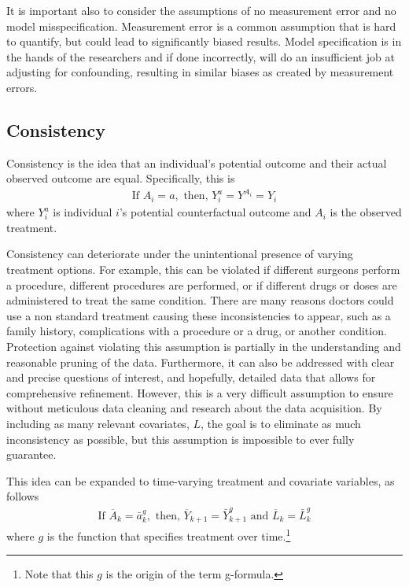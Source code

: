 It is important also to consider the assumptions of no measurement error and no model misspecification.  Measurement error is a common assumption that is hard to quantify, but could lead to significantly biased results.  Model specification is in the hands of the researchers and if done incorrectly, will do an insufficient job at adjusting for confounding, resulting in similar biases as created by measurement errors.  
 
\subsection{Consistency} 
Consistency is the idea that an individual's potential outcome and their actual observed outcome are equal\cite{cole2009consistency, hernan_robins_2016}.  Specifically, this is 
\begin{align} 
\text{If  } A_i = a, \text{     then,    } Y_i^a = Y^{A_i} = Y_i 
\end{align} 
where $Y_i^a$ is individual $i$'s potential counterfactual outcome and $A_i$ is the observed treatment.  

Consistency can deteriorate under the unintentional presence of varying treatment options.  For example, this can be violated if different surgeons perform a procedure, different procedures are performed, or if different drugs or doses are administered to treat the same condition.  There are many reasons doctors could use a non standard treatment causing these inconsistencies to appear, such as a family history, complications with a procedure or a drug, or another condition.  Protection against violating this assumption is partially in the understanding and reasonable pruning of the data.  Furthermore, it can also be addressed with clear and precise questions of interest, and hopefully, detailed data that allows for comprehensive refinement.  However, this is a very difficult assumption to ensure without meticulous data cleaning and research about the data acquisition.  By including as many relevant covariates, $L$, the goal is to eliminate as much inconsistency as possible, but this assumption is impossible to ever fully guarantee.  

This idea can be expanded to time-varying treatment and covariate variables, as follows 
\begin{align} 
\text{If } \overline{A}_k = \bar{a}^g _k, \text{ then, } \overline{Y}_{k+1} =  \bar{Y}^g_{k+1} \text{ and } \overline{L}_k = \bar{L}^g_k
\end{align}
where $g$ is the function that specifies treatment over time.\footnote{Note that this $g$ is the origin of the term g-formula.}

